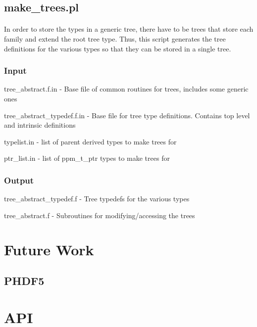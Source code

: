 \documentclass{article}
\begin{document}
\subsection{make\_trees.pl}
\paragraph{}
In order to store the types in a generic tree, there have to be trees that store each family and extend the root tree type. Thus, this script generates the tree definitions for the various types so that they can be stored in a single tree.
\subsubsection{Input}
\begin{list}{}{}
\item tree\_abstract.f.in - Base file of common routines for trees, includes some generic ones
\item tree\_abstract\_typedef.f.in - Base file for tree type definitions. Contains top level and intrinsic definitions
\item typelist.in - list of parent derived types to make trees for
\item ptr\_list.in - list of ppm\_t\_ptr types to make trees for
\end{list}
\subsubsection{Output}
\begin{list}{}{}
\item tree\_abstract\_typedef.f - Tree typedefs for the various types
\item tree\_abstract.f - Subroutines for modifying/accessing the trees
\end{list}

\section{Future Work}
\subsection{PHDF5}

\section{API}
\end{document}
